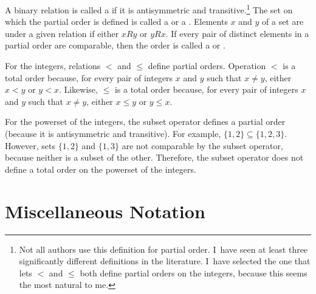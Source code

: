 A binary relation is called a
if it is antisymmetric and transitive.\footnote{Not all authors use
this definition for partial order.
I~have seen at least three significantly different definitions in the
literature.
I~have selected the one that lets \(<\) and \(\leq\) both define
partial orders on the integers, because this seems the most natural to
me.}
The set on which the partial order is defined is called a
 or a
.
Elements \(x\) and \(y\) of a set are  under a
given relation if either \(xRy\) or \(yRx\).
If every pair of distinct elements in a partial order are comparable,
then the order is called a  or
.

\begin{example}
For the integers, relations \(<\) and \(\leq\) define partial orders.
Operation \(<\) is a total order because, for every pair of integers
\(x\) and \(y\) such that \(x \neq y\), either \(x < y\) or \(y < x\).
Likewise, \(\leq\) is a total order because, for every pair of integers
\(x\) and \(y\) such that \(x \neq y\), either \(x \leq y\) or
\(y \leq x\).
\end{example}

\begin{example}
For the powerset of the integers, the subset
operator defines a partial order (because it is antisymmetric and
transitive).
For example, \(\{1, 2\}\subseteq\{1, 2, 3\}\).
However, sets \(\{1, 2\}\) and \(\{1, 3\}\) are not comparable by the
subset operator, because neither is a subset of the other.
Therefore, the subset operator does not define a total order on the
powerset of the integers.
\end{example}

\section{Miscellaneous Notation}
\label{MiscNote}

